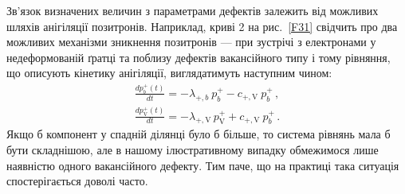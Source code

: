 Зв'язок визначених величин з параметрами дефектів залежить від можливих шляхів анігіляції позитронів.
Наприклад, криві 2 на рис.~\ref{F31} свідчить про два можливих механізми зникнення позитронів --- при зустрічі з електронами
у недеформованій ґратці та поблизу дефектів вакансійного типу і
тому рівняння, що описують кінетику анігіляції, виглядатимуть наступним чином:
\begin{gather}
 \frac{dp_{b}^+(t)}{dt}= -\lambda_{+,b}\:p_{b}^+ - c_{+,\mathrm{V}} \:p_{b}^+ \,, \label{PASnb1}\\
\frac{dp_{\mathrm{V}}^+(t)}{dt}= - \lambda_{+,\mathrm{V}}\,p_{\mathrm{V}}^+ + c_{+,\mathrm{V}} \:p_{b}^+ \,.\label{PASnv1}
\end{gather}
Якщо б компонент у спадній ділянці було б більше, то система рівнянь мала б бути складнішою,
але в нашому ілюстративному випадку обмежимося лише наявністю одного вакансійного дефекту.
Тим паче, що на практиці така ситуація спостерігається доволі часто.

